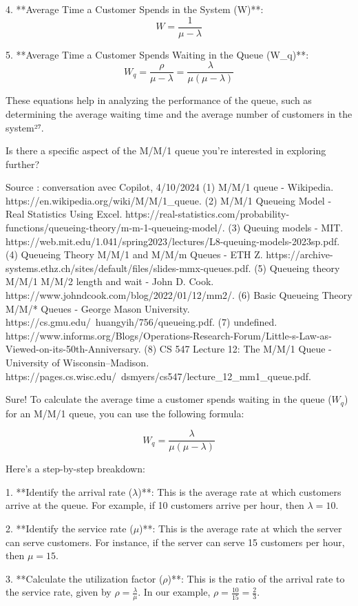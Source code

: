 4. **Average Time a Customer Spends in the System (W)**:
   $$W = \frac{1}{\mu - \lambda}$$

5. **Average Time a Customer Spends Waiting in the Queue (W_q)**:
   $$W_q = \frac{\rho}{\mu - \lambda} = \frac{\lambda}{\mu(\mu - \lambda)}$$

These equations help in analyzing the performance of the queue, such as determining the average waiting time and the average number of customers in the system²⁷.

Is there a specific aspect of the M/M/1 queue you're interested in exploring further?

Source : conversation avec Copilot, 4/10/2024
(1) M/M/1 queue - Wikipedia. https://en.wikipedia.org/wiki/M/M/1_queue.
(2) M/M/1 Queueing Model - Real Statistics Using Excel. https://real-statistics.com/probability-functions/queueing-theory/m-m-1-queueing-model/.
(3) Queuing models - MIT. https://web.mit.edu/1.041/spring2023/lectures/L8-queuing-models-2023sp.pdf.
(4) Queueing Theory M/M/1 and M/M/m Queues - ETH Z. https://archive-systems.ethz.ch/sites/default/files/slides-mmx-queues.pdf.
(5) Queueing theory M/M/1 M/M/2 length and wait - John D. Cook. https://www.johndcook.com/blog/2022/01/12/mm2/.
(6) Basic Queueing Theory M/M/* Queues - George Mason University. https://cs.gmu.edu/~huangyih/756/queueing.pdf.
(7) undefined. https://www.informs.org/Blogs/Operations-Research-Forum/Little-s-Law-as-Viewed-on-its-50th-Anniversary.
(8) CS 547 Lecture 12: The M/M/1 Queue - University of Wisconsin–Madison. https://pages.cs.wisc.edu/~dsmyers/cs547/lecture_12_mm1_queue.pdf.



Sure! To calculate the average time a customer spends waiting in the queue (\(W_q\)) for an M/M/1 queue, you can use the following formula:

$$W_q = \frac{\lambda}{\mu (\mu - \lambda)}$$

Here's a step-by-step breakdown:

1. **Identify the arrival rate (\(\lambda\))**: This is the average rate at which customers arrive at the queue. For example, if 10 customers arrive per hour, then \(\lambda = 10\).

2. **Identify the service rate (\(\mu\))**: This is the average rate at which the server can serve customers. For instance, if the server can serve 15 customers per hour, then \(\mu = 15\).

3. **Calculate the utilization factor (\(\rho\))**: This is the ratio of the arrival rate to the service rate, given by \(\rho = \frac{\lambda}{\mu}\). In our example, \(\rho = \frac{10}{15} = \frac{2}{3}\).

